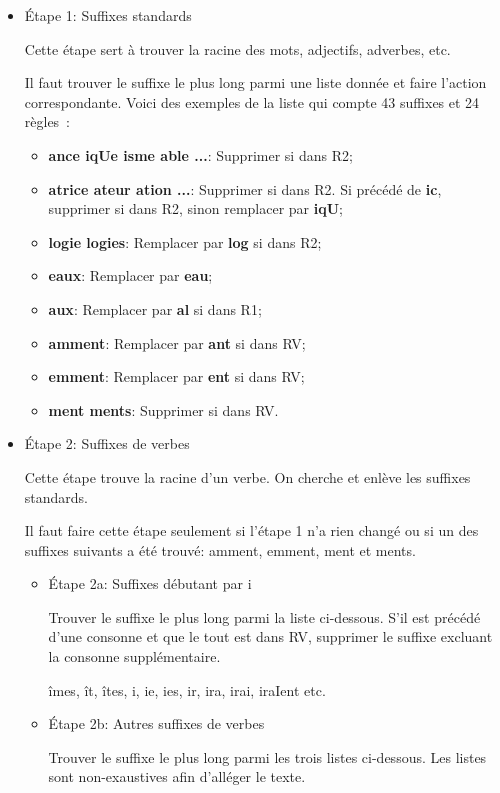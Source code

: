 \begin{itemize}
\item{Étape 1: Suffixes standards}

Cette étape sert à trouver la racine des mots, adjectifs, adverbes, etc.

Il faut trouver le suffixe le plus long parmi une liste donnée et faire l'action correspondante.
Voici des exemples de la liste qui compte 43 suffixes et 24 règles~: 

\begin{itemize}
  \item \textbf{ance iqUe isme able ...}: Supprimer si dans R2;
  \item \textbf{atrice ateur ation ...}: Supprimer si dans R2. Si précédé de \textbf{ic}, supprimer si dans R2, sinon remplacer par \textbf{iqU};
  \item \textbf{logie logies}: Remplacer par \textbf{log} si dans R2;
  \item \textbf{eaux}: Remplacer par \textbf{eau};
  \item \textbf{aux}: Remplacer par \textbf{al} si dans R1;
  \item \textbf{amment}: Remplacer par \textbf{ant} si dans RV;
  \item \textbf{emment}: Remplacer par \textbf{ent} si dans RV;
  \item \textbf{ment ments}: Supprimer si dans RV.
\end{itemize}

\item{Étape 2: Suffixes de verbes}

Cette étape trouve la racine d'un verbe.
On cherche et enlève les suffixes standards.

Il faut faire cette étape seulement si l'étape 1 n'a rien changé ou si un des suffixes suivants a été trouvé: amment, emment, ment et ments.

\begin{itemize}
\item{Étape 2a: Suffixes débutant par i}

Trouver le suffixe le plus long parmi la liste ci-dessous.
S'il est précédé d'une consonne et que le tout est dans RV, supprimer le suffixe excluant la consonne supplémentaire.

îmes, ît, îtes, i, ie, ies, ir, ira, irai, iraIent etc.

\item{Étape 2b: Autres suffixes de verbes}

Trouver le suffixe le plus long parmi les trois listes ci-dessous.
Les listes sont non-exaustives afin d'alléger le texte.


\end{itemize}
\end{itemize}
